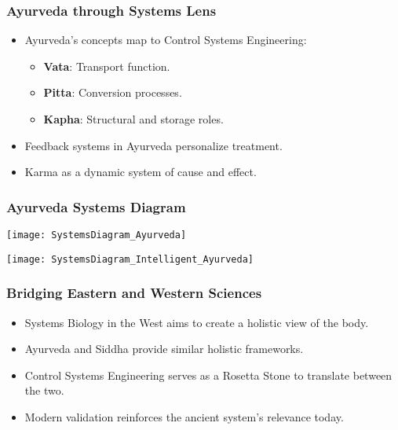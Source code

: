 \begin{frame}[fragile]\frametitle{Ayurveda through Systems Lens}
      \begin{itemize}
        \item Ayurveda’s concepts map to Control Systems Engineering:
          \begin{itemize}
            \item \textbf{Vata}: Transport function.
            \item \textbf{Pitta}: Conversion processes.
            \item \textbf{Kapha}: Structural and storage roles.
          \end{itemize}
        \item Feedback systems in Ayurveda personalize treatment.
        \item Karma as a dynamic system of cause and effect.
      \end{itemize}
\end{frame}


\begin{frame}[fragile]\frametitle{Ayurveda Systems Diagram}

\begin{center}
\texttt{[image: SystemsDiagram\_Ayurveda]}

\texttt{[image: SystemsDiagram\_Intelligent\_Ayurveda]}

\end{center}	  
\end{frame}


\begin{frame}[fragile]\frametitle{Bridging Eastern and Western Sciences}
      \begin{itemize}
        \item Systems Biology in the West aims to create a holistic view of the body.
        \item Ayurveda and Siddha provide similar holistic frameworks.
        \item Control Systems Engineering serves as a Rosetta Stone to translate between the two.
        \item Modern validation reinforces the ancient system’s relevance today.
      \end{itemize}
\end{frame}
